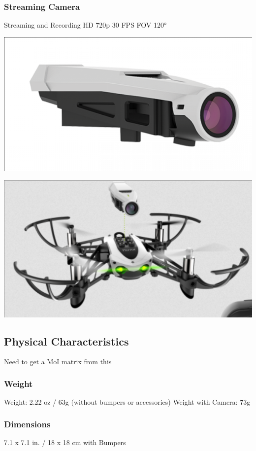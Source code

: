 \documentclass[unrestricted]{meetingnotesminutes}
\begin{document}
\subsubsection{Streaming Camera}
\label{sec:org409d368}
Streaming and Recording HD 720p 30 FPS
FOV 120°
\begin{center}
\includegraphics[width=.9\linewidth]{./images/screenshot-02.png}
\end{center}

\begin{center}
\includegraphics[width=.9\linewidth]{./images/screenshot-03.png}
\end{center}

\subsection{Physical Characteristics}
\label{sec:orgb6f7784}
Need to get a MoI matrix from this
\subsubsection{Weight}
\label{sec:orgfccc059}
Weight: 2.22 oz / 63g (without bumpers or accessories)
Weight with Camera: 73g
\subsubsection{Dimensions}
\label{sec:org32c8f5f}
7.1 x 7.1 in. / 18 x 18 cm with Bumpers
\end{document}
